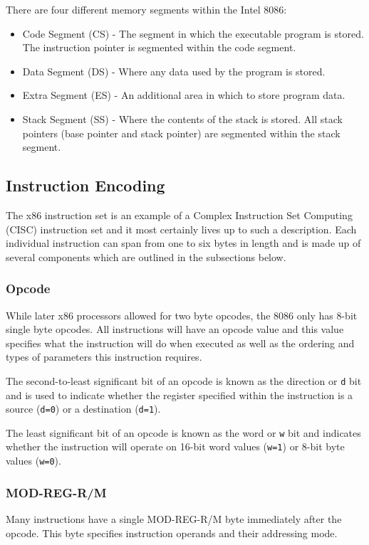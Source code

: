 	There are four different memory segments within the Intel 8086:
	\begin{itemize}
		\item Code Segment (CS) - The segment in which the executable program is stored. The instruction pointer is segmented within the code segment.
		\item Data Segment (DS) - Where any data used by the program is stored.
		\item Extra Segment (ES) - An additional area in which to store program data.
		\item Stack Segment (SS) - Where the contents of the stack is stored. All stack pointers (base pointer and stack pointer) are segmented within the stack segment.
	\end{itemize}

\subsection{Instruction Encoding}
	The x86 instruction set is an example of a Complex Instruction Set Computing (CISC) instruction set and it most certainly lives up to such a description. Each individual instruction can span from one to six bytes in length and is made up of several components which are outlined in the subsections below.

	\subsubsection{Opcode}
		While later x86 processors allowed for two byte opcodes, the 8086 only has 8-bit single byte opcodes. All instructions will have an opcode value and this value specifies what the instruction will do when executed as well as the ordering and types of parameters this instruction requires.

		The second-to-least significant bit of an opcode is known as the direction or \texttt{d} bit and is used to indicate whether the register specified within the instruction is a source (\texttt{d=0}) or a destination (\texttt{d=1}).

		The least significant bit of an opcode is known as the word or \texttt{w} bit and indicates whether the instruction will operate on 16-bit word values (\texttt{w=1}) or 8-bit byte values (\texttt{w=0}).

	\subsubsection{MOD-REG-R/M}
		Many instructions have a single MOD-REG-R/M byte immediately after the opcode. This byte specifies instruction operands and their addressing mode.

